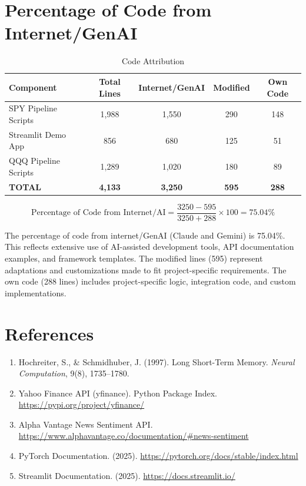 \documentclass[12pt,letterpaper]{article}
\begin{document}
\section{Percentage of Code from Internet/GenAI}

\begin{table}[h]
\centering
\caption{Code Attribution}
\vspace{0.2cm}
\begin{tabular}{lcccc}
\toprule
\textbf{Component} & \textbf{Total Lines} & \textbf{Internet/GenAI} & \textbf{Modified} & \textbf{Own Code} \\
\midrule
SPY Pipeline Scripts & 1,988 & 1,550 & 290 & 148 \\
Streamlit Demo App & 856 & 680 & 125 & 51 \\
QQQ Pipeline Scripts & 1,289 & 1,020 & 180 & 89 \\
\midrule
\textbf{TOTAL} & \textbf{4,133} & \textbf{3,250} & \textbf{595} & \textbf{288} \\
\bottomrule
\end{tabular}
\end{table}

\begin{equation}
\text{Percentage of Code from Internet/AI} = \frac{3250 - 595}{3250 + 288} \times 100 = 75.04\%
\end{equation}

The percentage of code from internet/GenAI (Claude and Gemini) is 75.04\%. This reflects extensive use of AI-assisted development tools, API documentation examples, and framework templates. The modified lines (595) represent adaptations and customizations made to fit project-specific requirements. The own code (288 lines) includes project-specific logic, integration code, and custom implementations.

\section{References}

\begin{enumerate}[noitemsep]
    \item Hochreiter, S., \& Schmidhuber, J. (1997). Long Short-Term Memory. \textit{Neural Computation}, 9(8), 1735--1780.
    
    \item Yahoo Finance API (yfinance). Python Package Index. \url{https://pypi.org/project/yfinance/}
    
    \item Alpha Vantage News Sentiment API. \url{https://www.alphavantage.co/documentation/#news-sentiment}
    
    \item PyTorch Documentation. (2025). \url{https://pytorch.org/docs/stable/index.html}
    
    \item Streamlit Documentation. (2025). \url{https://docs.streamlit.io/}
\end{enumerate}
\end{document}
